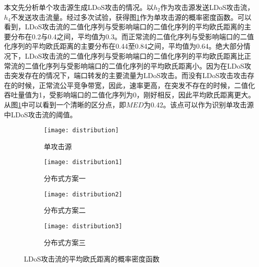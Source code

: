 本文先分析单个攻击源生成LDoS攻击的情况。以$h_2$作为攻击源发送LDoS攻击流，$h_4$不发送攻击流量。经过多次试验，获得图\ref{fig:PDF-single}作为单攻击源的概率密度函数。可以看到，LDoS攻击流的二值化序列与受影响端口的二值化序列的平均欧氏距离的主要分布在0.2与0.4之间，平均值为0.3。而正常流的二值化序列与受影响端口的二值化序列的平均欧氏距离的主要分布在0.44至0.84之间，平均值为0.64。绝大部分情况下，LDoS攻击流的二值化序列与受影响端口的二值化序列的平均欧氏距离比正常流的二值化序列与受影响端口的二值化序列的平均欧氏距离小。因为在LDoS攻击突发存在的情况下，端口转发的主要流量为LDoS攻击。而没有LDoS攻击攻击存在的时候，正常流公平竞争带宽，因此，速率更高，在突发不存在的时候，二值化吞吐量值为1，受影响端口的二值化序列为0，刚好相反，因此平均欧氏距离更大。从图\ref{fig:PDF-single}中可以看到一个清晰的区分点，即$MED$为0.42。该点可以作为识别单攻击源中LDoS攻击流的阈值。


\begin{figure}
    \begin{subfigure}{.49\textwidth}
        \centering
        \texttt{[image: distribution]}
        \caption{单攻击源}
        \label{fig:PDF-single}
    \end{subfigure}
    \begin{subfigure}{.49\textwidth}
        \centering
        \texttt{[image: distribution1]}
        \caption{分布式方案一}
        \label{fig:PDF-2h-mod1}
    \end{subfigure}

    \begin{subfigure}{.49\textwidth}
        \centering
        \texttt{[image: distribution2]}
        \caption{分布式方案二}
        \label{fig:PDF-2h-mod2}
    \end{subfigure}
    \begin{subfigure}{.49\textwidth}
        \centering
        \texttt{[image: distribution3]}
        \caption{分布式方案三}
        \label{fig:PDF-2h-mod3}
    \end{subfigure}


    \caption{LDoS攻击流的平均欧氏距离的概率密度函数}
    \label{fig:PDF-all}
\end{figure}





